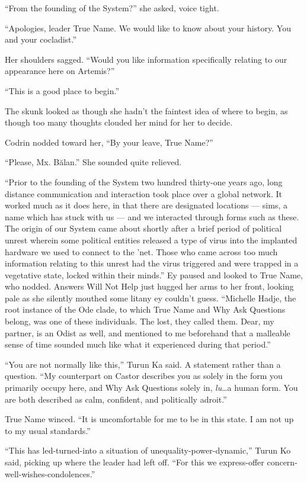 ``From the founding of the System?'' she asked, voice tight.

``Apologies, leader True Name. We would like to know about your history. You and your cocladist.''

Her shoulders sagged. ``Would you like information specifically relating to our appearance here on Artemis?''

``This is a good place to begin.''

The skunk looked as though she hadn't the faintest idea of where to begin, as though too many thoughts clouded her mind for her to decide.

Codrin nodded toward her, ``By your leave, True Name?''

``Please, Mx. Bălan.'' She sounded quite relieved.

``Prior to the founding of the System two hundred thirty-one years ago, long distance communication and interaction took place over a global network. It worked much as it does here, in that there are designated locations — sims, a name which has stuck with us — and we interacted through forms such as these. The origin of our System came about shortly after a brief period of political unrest wherein some political entities released a type of virus into the implanted hardware we used to connect to the 'net. Those who came across too much information relating to this unrest had the virus triggered and were trapped in a vegetative state, locked within their minds.'' Ey paused and looked to True Name, who nodded. Answers Will Not Help just hugged her arms to her front, looking pale as she silently mouthed some litany ey couldn't guess. ``Michelle Hadje, the root instance of the Ode clade, to which True Name and Why Ask Questions belong, was one of these individuals. The lost, they called them. Dear, my partner, is an Odist as well, and mentioned to me beforehand that a malleable sense of time sounded much like what it experienced during that period.''

``You are not normally like this,'' Turun Ka said. A statement rather than a question. ``My counterpart on Castor describes you as solely in the form you primarily occupy here, and Why Ask Questions solely in, \emph{lu}\ldots a human form. You are both described as calm, confident, and politically adroit.''

True Name winced. ``It is uncomfortable for me to be in this state. I am not up to my usual standards.''

``This has led-turned-into a situation of unequality-power-dynamic,'' Turun Ko said, picking up where the leader had left off. ``For this we express-offer concern-well-wishes-condolences.''

